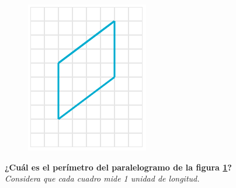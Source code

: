 \begin{figure}
    \centering
    \includegraphics[width=\linewidth]{../images/peri_paralelogramo_01.png}
    \caption{}
    \label{fig:peri_paralelogramo_01}
\end{figure}
\textbf{¿Cuál es el perímetro del paralelogramo de la figura \ref{fig:peri_paralelogramo_01}?}\\
\emph{Considera que cada cuadro mide 1 unidad de longitud.}
\vspace{4cm}
